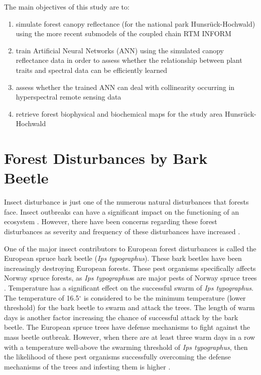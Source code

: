 \documentclass[a4paper, twoside]{templates/ociamthesis}
\providecommand{\tightlist}{%
  \setlength{\itemsep}{0pt}\setlength{\parskip}{0pt}}
\begin{document}
The main objectives of this study are to:

\begin{enumerate}
\def\labelenumi{\arabic{enumi}.}
\tightlist
\item
  simulate forest canopy reflectance (for the national park Hunsrück-Hochwald) using the more recent submodels of the coupled chain RTM INFORM
\item
  train Artificial Neural Networks (ANN) using the simulated canopy reflectance data in order to assess whether the relationship between plant traits and spectral data can be efficiently learned
\item
  assess whether the trained ANN can deal with collinearity occurring in hyperspectral remote sensing data
\item
  retrieve forest biophysical and biochemical maps for the study area Hunsrück-Hochwald
\end{enumerate}

\hypertarget{forest-disturbances-by-bark-beetle}{%
\chapter{Forest Disturbances by Bark Beetle}\label{forest-disturbances-by-bark-beetle}}

Insect disturbance is just one of the numerous natural disturbances that forests face. Insect outbreaks can have a significant impact on the functioning of an ecosystem \citep{raffa2009literal}. However, there have been concerns regarding these forest disturbances as severity and frequency of these disturbances have increased \citep{millar2015temperate}.

One of the major insect contributors to European forest disturbances is called the European spruce bark beetle (\emph{Ips typographus}). These bark beetles have been increasingly destroying European forests. These pest organisms specifically affects Norway spruce forests, as \emph{Ips typographus}s are major pests of Norway spruce trees \citep{ohrn2014seasonal}. Temperature has a significant effect on the successful swarm of \emph{Ips typographus}. The temperature of 16.5\(^\circ\) is considered to be the minimum temperature (lower threshold) for the bark beetle to swarm and attack the trees. The length of warm days is another factor increasing the chance of successful attack by the bark beetle. The European spruce trees have defense mechanisms to fight against the mass beetle outbreak. However, when there are at least three warm days in a row with a temperature well-above the swarming threshold of \emph{Ips typographus}, then the likelihood of these pest organisms successfully overcoming the defense mechanisms of the trees and infesting them is higher \citep{wermelinger2004ecology}.
\end{document}
